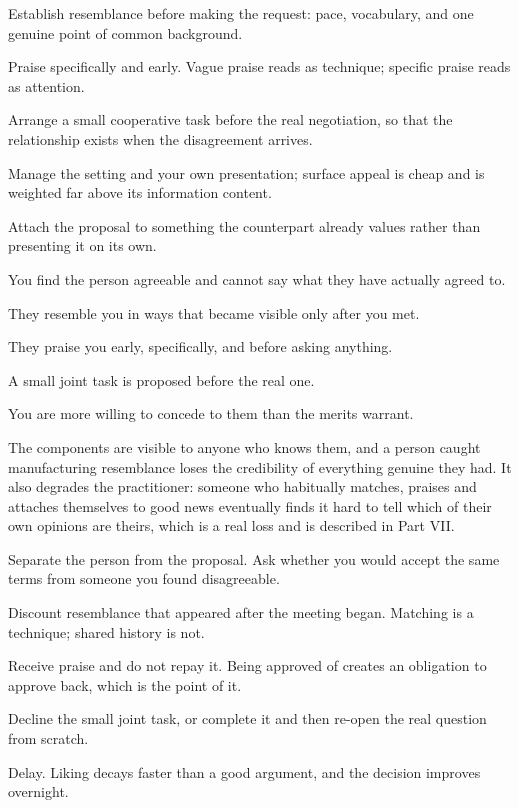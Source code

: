 \begin{application}
  \item Establish resemblance before making the request: pace, vocabulary, and one genuine point of common background.
  \item Praise specifically and early. Vague praise reads as technique; specific praise reads as attention.
  \item Arrange a small cooperative task before the real negotiation, so that the relationship exists when the disagreement arrives.
  \item Manage the setting and your own presentation; surface appeal is cheap and is weighted far above its information content.
  \item Attach the proposal to something the counterpart already values rather than presenting it on its own.
\end{application}

\begin{feedback}
  \item You find the person agreeable and cannot say what they have actually agreed to.
  \item They resemble you in ways that became visible only after you met.
  \item They praise you early, specifically, and before asking anything.
  \item A small joint task is proposed before the real one.
  \item You are more willing to concede to them than the merits warrant.
\end{feedback}

\begin{failure}
The components are visible to anyone who knows them, and a person caught manufacturing resemblance loses the credibility of everything genuine they had. It also degrades the practitioner: someone who  habitually matches, praises and attaches themselves to good news eventually finds it hard to tell which of their own opinions are theirs, which is a real loss and is described in Part VII.
\end{failure}

\begin{countermeasures}
  \item Separate the person from the proposal. Ask whether you would accept the same terms from someone you found disagreeable.
  \item Discount resemblance that appeared after the meeting began. Matching is a technique; shared history is not.
  \item Receive praise and do not repay it. Being approved of creates an obligation to approve back, which is the point of it.
  \item Decline the small joint task, or complete it and then re-open the real question from scratch.
  \item Delay. Liking decays faster than a good argument, and the decision improves overnight.
\end{countermeasures}

\seesources
{}
